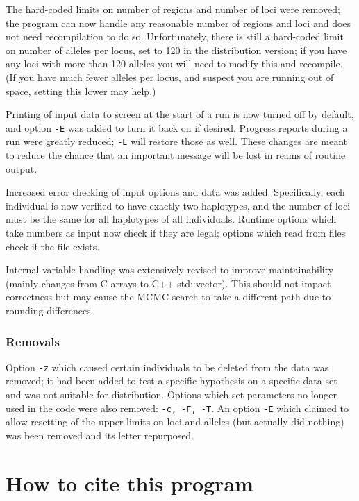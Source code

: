 \documentclass[10pt,titlepage,times,letterpaper]{article}
\begin{document}
The hard-coded limits on number of regions and number of loci were removed; 
the program can now handle any reasonable number of regions and loci and does not need
recompilation to do so.  Unfortunately, there is still a hard-coded limit
on number of alleles per locus, set to 120 in the distribution version; if you
have any loci with more than 120 alleles you will need to modify this and
recompile.  (If you have much fewer alleles per locus, and suspect you are
running out of space, setting this lower may help.)

Printing of input data to screen at the start of a run is now turned off
by default, and option {\tt -E} was added to turn it back on if desired.
Progress reports during a run were greatly reduced; {\tt -E} will
restore those as well.  These changes are
meant to reduce the chance that an important message will be
lost in reams of routine output.

Increased error checking of input options and data was added.  Specifically,
each individual is now verified to have exactly two haplotypes, and the
number of loci must be the same for all haplotypes of all individuals.
Runtime options which take numbers as input now check if they are legal;
options which read from files check if the file exists.

Internal variable handling was extensively revised to improve maintainability
(mainly changes from C arrays to C++ std::vector).
This should not impact correctness but may cause the MCMC search to take a
different path due to rounding differences.

\subsubsection{Removals}
Option {\tt -z} which caused certain individuals to be deleted
from the data was removed; it had been added to test a specific hypothesis
on a specific data set and was not suitable for distribution.
Options which set parameters no longer used in the code were
also removed:  {\tt -c, -F, -T}.  An option {\tt -E} which claimed
to allow resetting of the upper limits on loci and alleles (but
actually did nothing) was been removed and its letter repurposed.


\section{How to cite this program}
\end{document}

